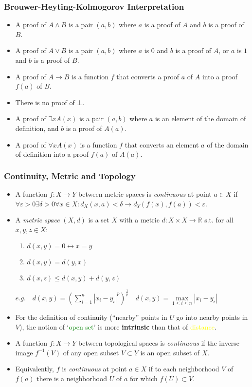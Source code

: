 \documentclass[UTF8,aspectratio=43,11pt,colorlinks,compress,openany]{beamer}%
\begin{document}
\begin{frame}\frametitle{Brouwer-Heyting-Kolmogorov Interpretation}
\begin{itemize}
	\item A proof of $A\wedge B$ is a pair $(a,b)$ where $a$ is a proof of $A$ and $b$ is a proof of $B$.
	\item A proof of $A\vee B$ is a pair $(a,b)$ where $a$ is $0$ and $b$ is a proof of $A$, or $a$ is $1$ and $b$ is a proof of $B$.
	\item A proof of $A\to B$ is a function $f$ that converts a proof $a$ of $A$ into a proof $f(a)$ of $B$.
	\item There is no proof of $\bot$.
	\item A proof of $\exists x A(x)$ is a pair $(a,b)$ where $a$ is an element of the domain of definition, and $b$ is a proof of $A(a)$.
	\item A proof of $\forall x A(x)$ is a function $f$ that converts an element $a$ of the domain of definition into a proof $f(a)$ of $A(a)$.
\end{itemize}
\end{frame}

\begin{frame}\frametitle{Continuity, Metric and Topology}
\begin{itemize}
	\item A function $f: X\to Y$ between metric spaces is \emph{continuous} at point $a\in X$ if $\forall\varepsilon>0\exists\delta>0\forall x\in X: d_X(x,a)<\delta\to d_Y(f(x),f(a))<\varepsilon$.
	\item A \emph{metric space} $(X,d)$ is a set $X$ with a metric $d:X\times X\to \mathbb{R}$ s.t. for all $x,y,z\in X$:
\begin{enumerate}
	\item $d(x,y)=0\leftrightarrow x=y$
	\item $d(x,y)=d(y,x)$
	\item $d(x,z)\leq d(x,y)+d(y,z)$
\end{enumerate}
$e.g.\quad d(x,y)=\left(\sum\limits_{i=1}^n|x_i-y_i|^p\right)^{\frac{1}{p}}\quad d(x,y)=\max\limits_{1\leq i\leq n}|x_i-y_i|$
	\item For the definition of continuity (``nearby'' points in $U$ go into nearby points in $V$), the notion of `\textcolor{green}{open set}' is more \textbf{intrinsic} than that of \textcolor{yellow}{distance}.
	\item A function $f: X\to Y$ between topological spaces is \emph{continuous} if the inverse image $f^{-1}(V)$ of any open subset $V\subset Y$ is an open subset of $X$.
	\item Equivalently, $f$ is \emph{continuous} at point $a\in X$ if to each neighborhood $V$ of $f(a)$ there is a neighborhood $U$ of $a$ for which $f(U)\subset V$.
\end{itemize}
\end{frame}
\end{document}
